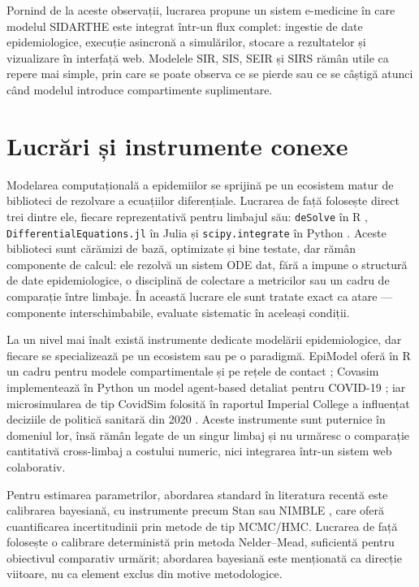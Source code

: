 Pornind de la aceste observații, lucrarea propune un sistem e-medicine în care
modelul SIDARTHE este integrat într-un flux complet: ingestie de date
epidemiologice, execuție asincronă a simulărilor, stocare a rezultatelor și
vizualizare în interfață web. Modelele SIR, SIS, SEIR și SIRS rămân utile ca
repere mai simple, prin care se poate observa ce se pierde sau ce se câștigă
atunci când modelul introduce compartimente suplimentare.

{}
\section*{Lucrări și instrumente conexe}
\label{sec:lucrari_inrudite}

Modelarea computațională a epidemiilor se sprijină pe un ecosistem matur de
biblioteci de rezolvare a ecuațiilor diferențiale. Lucrarea de față folosește
direct trei dintre ele, fiecare reprezentativă pentru limbajul său:
\texttt{deSolve} în R \cite{soetaert2010desolve},
\texttt{DifferentialEquations.jl} în Julia \cite{rackauckas2017diffeq} și
\texttt{scipy.integrate} în Python \cite{virtanen2020scipy}. Aceste biblioteci
sunt cărămizi de bază, optimizate și bine testate, dar rămân componente de
calcul: ele rezolvă un sistem ODE dat, fără a impune o structură de date
epidemiologice, o disciplină de colectare a metricilor sau un cadru de
comparație între limbaje. În această lucrare ele sunt tratate exact ca atare ---
componente interschimbabile, evaluate sistematic în aceleași condiții.

La un nivel mai înalt există instrumente dedicate modelării epidemiologice, dar
fiecare se specializează pe un ecosistem sau pe o paradigmă. EpiModel oferă în R
un cadru pentru modele compartimentale și pe rețele de contact
\cite{jenness2018epimodel}; Covasim implementează în Python un model
agent-based detaliat pentru COVID-19 \cite{kerr2021covasim}; iar microsimularea
de tip CovidSim folosită în raportul Imperial College a influențat deciziile de
politică sanitară din 2020 \cite{ferguson2020impact}. Aceste instrumente sunt
puternice în domeniul lor, însă rămân legate de un singur limbaj și nu urmăresc
o comparație cantitativă cross-limbaj a costului numeric, nici integrarea
într-un sistem web colaborativ.

Pentru estimarea parametrilor, abordarea standard în literatura recentă este
calibrarea bayesiană, cu instrumente precum Stan \cite{carpenter2017stan} sau
NIMBLE \cite{devalpine2017nimble}, care oferă cuantificarea incertitudinii prin
metode de tip MCMC/HMC. Lucrarea de față folosește o calibrare deterministă prin
metoda Nelder--Mead, suficientă pentru obiectivul comparativ urmărit; abordarea
bayesiană este menționată ca direcție viitoare, nu ca element exclus din motive
metodologice.

